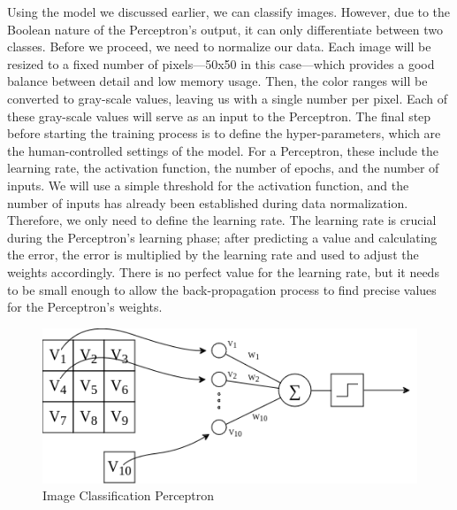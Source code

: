 \documentclass{article}
\begin{document}
Using the model we discussed earlier, we can classify images. However, due to the Boolean nature of the Perceptron's output, it can only differentiate between two classes. Before we proceed, we need to normalize our data. Each image will be resized to a fixed number of pixels—50x50 in this case—which provides a good balance between detail and low memory usage. Then, the color ranges will be converted to gray-scale values, leaving us with a single number per pixel. Each of these gray-scale values will serve as an input to the Perceptron. The final step before starting the training process is to define the hyper-parameters, which are the human-controlled settings of the model. For a Perceptron, these include the learning rate, the activation function, the number of epochs, and the number of inputs. We will use a simple threshold for the activation function, and the number of inputs has already been established during data normalization. Therefore, we only need to define the learning rate. The learning rate is crucial during the Perceptron's learning phase; after predicting a value and calculating the error, the error is multiplied by the learning rate and used to adjust the weights accordingly. There is no perfect value for the learning rate, but it needs to be small enough to allow the back-propagation process to find precise values for the Perceptron's weights.

\begin{figure}[ht]
    \centering
    \includegraphics[width=0.75\linewidth]{assets/intro/perceptron-image-classification.png}
    \caption{Image Classification Perceptron}
    \label{fig:perceptron-image-classification}
\end{figure}
\end{document}
